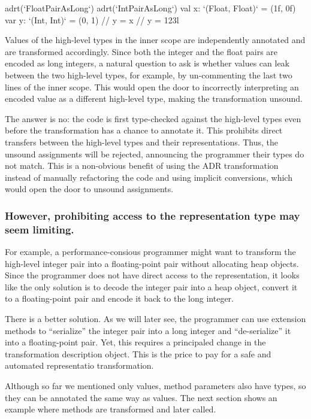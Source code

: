 \begin{lstlisting-nobreak}
adrt(`FloatPairAsLong`) {
  adrt(`IntPairAsLong`) {
    val x: `(Float, Float)` = (1f, 0f)
    var y: `(Int, Int)` = (0, 1)
    // y = x
    // y = 123l
  }
}
\end{lstlisting-nobreak}

Values of the high-level types in the inner scope are independently annotated and are transformed accordingly. Since both the integer and the float pairs are encoded as long integers, a natural question to ask is whether values can leak between the two high-level types, for example, by un-commenting the last two lines of the inner scope. This would open the door to incorrectly interpreting an encoded value as a different high-level type, making the transformation unsound.

The answer is no: the code is first type-checked against the high-level types even before the \inject{} transformation has a chance to annotate it. This prohibits direct transfers between the high-level types and their representations. Thus, the unsound assignments will be rejected, announcing the programmer their types do not match. This is a non-obvious benefit of using the ADR transformation instead of manually refactoring the code and using implicit conversions, which would open the door to unsound assignments.


\subsubsection{However, prohibiting access to the representation type may seem limiting.} For example, a performance-consious programmer might want to transform the high-level integer pair into a floating-point pair without allocating heap objects. Since the programmer does not have direct access to the representation, it looks like the only solution is to decode the integer pair into a heap object, convert it to a floating-point pair and encode it back to the long integer.

There is a better solution. As we will later see, the programmer can use extension methods to ``serialize'' the integer pair into a long integer and ``de-serialize'' it into a floating-point pair. Yet, this requires a principaled change in the transformation description object. This is the price to pay for a safe and automated representatio transformation.

Although so far we mentioned only values, method parameters also have types, so they can be annotated the same way as values. The next section shows an example where methods are transformed and later called.









